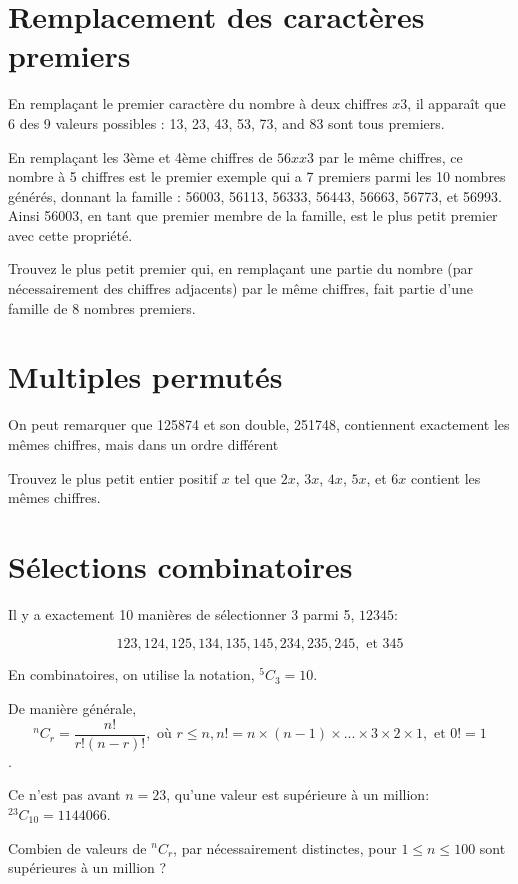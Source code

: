 \section{Remplacement des caractères premiers} \label{pb.051}

En remplaçant le premier caractère du nombre à deux chiffres $x3$, il apparaît que 6 des 9 valeurs possibles : 13, 23, 43, 53, 73, and 83 sont tous premiers.

En remplaçant les 3ème et 4ème chiffres de $56xx3$ par le même chiffres, ce nombre à 5 chiffres est le premier exemple qui a 7 premiers parmi les 10 nombres générés, donnant la famille : 56003, 56113, 56333, 56443, 56663, 56773, et 56993. Ainsi 56003, en tant que premier membre de la famille, est le plus petit premier avec cette propriété.

Trouvez le plus petit premier qui, en remplaçant une partie du nombre (par nécessairement des chiffres adjacents) par le même chiffres, fait partie d'une famille de 8 nombres premiers.

\section{Multiples permutés} \label{pb.052}

On peut remarquer que 125874 et son double, 251748, contiennent exactement les mêmes chiffres, mais dans un ordre différent

Trouvez le plus petit entier positif $x$ tel que $2x$, $3x$, $4x$, $5x$, et $6x$ contient les mêmes chiffres.

\section{Sélections combinatoires} \label{pb.053}

Il y a exactement 10 manières de sélectionner 3 parmi 5, $12345$:

$$123, 124, 125, 134, 135, 145, 234, 235, 245, \text{ et } 345$$

En combinatoires, on utilise la notation, $^5C_3 = 10$.

De manière générale,
$$^nC_r = \frac{n!}{r!(n-r)!},\text{ où } r \leqslant n, n! = n \times (n-1) \times ... \times 3 \times 2 \times 1, \text{ et } 0! = 1$$.

Ce n'est pas avant $n = 23$, qu'une valeur est supérieure à un million: $^{23}C_{10} = 1144066$.

Combien de valeurs de $^nC_r$, par nécessairement distinctes, pour $1\leqslant n\leqslant100$ sont supérieures à un million ?

